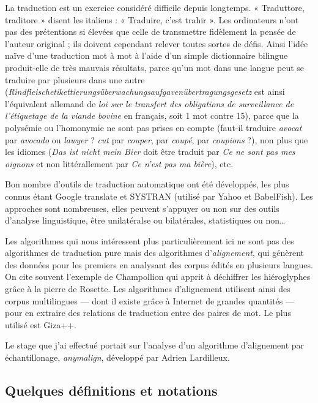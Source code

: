 \documentclass[a4paper,10pt]{article}
\newcommand{\anym}{\emph{anymalign}}
\newcommand{\guill}[1]{« #1 »}
\begin{document}
La traduction est un exercice considéré difficile depuis longtemps. \guill{Traduttore, traditore} disent les italiens : \guill{Traduire, c'est trahir}. Les ordinateurs n'ont pas des prétentions si élevées que celle de transmettre fidèlement la pensée de l'auteur original ; ils doivent cependant relever toutes sortes de défis. Ainsi l'idée naïve d'une traduction mot à mot à l'aide d'un simple dictionnaire bilingue produit-elle de très mauvais résultats, parce qu'un mot dans une langue peut se traduire par plusieurs dans une autre (\emph{Rindfleischetikettierungsüberwachungsaufgavenübertragungsgesetz} est ainsi l'équivalent allemand de \emph{loi sur le transfert des obligations de surveillance de l'étiquetage de la viande bovine} en français, soit 1 mot contre 15), parce que la polysémie ou l'homonymie ne sont pas prises en compte (faut-il traduire \emph{avocat} par \emph{avocado} ou \emph{lawyer} ? \emph{cut} par \emph{couper}, par \emph{coupé}, par \emph{coupions} ?), non plus que les idiomes (\emph{Das ist nicht mein Bier} doit être traduit par \emph{Ce ne sont pas mes oignons} et non littérallement par \emph{Ce n'est pas ma bière}), etc.

Bon nombre d'outils de traduction automatique ont été développés, les plus connus étant Google translate et SYSTRAN (utilisé par Yahoo et BabelFish). Les approches sont nombreuses, elles peuvent s'appuyer ou non sur des outils d'analyse linguistique, être unilatéralse ou bilatérales, statistiques ou non\dots

Les algorithmes qui nous intéressent plus particulièrement ici ne sont pas des algorithmes de traduction pure mais des algorithmes d'\emph{alignement}, qui génèrent des données pour les premiers en analysant des corpus édités en plusieurs langues. On cite souvent l'exemple de Champollion qui apprit à déchiffrer les hiéroglyphes grâce à la pierre de Rosette. Les algorithmes d'alignement utilisent ainsi des corpus multilingues --- dont il existe grâce à Internet de grandes quantités --- pour en extraire des relations de traduction entre des paires de mot. Le plus utilisé est Giza++.



Le stage que j'ai effectué portait sur l'analyse d'un algorithme d'alignement par échantillonage, \anym, développé par Adrien Lardilleux.


\subsection{Quelques définitions et notations}
\end{document}
